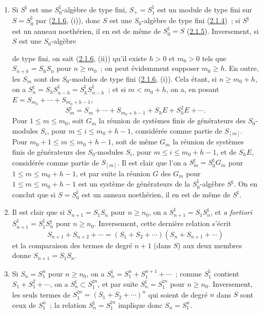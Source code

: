 \begin{enumerate}
\item[\rm(i)] Si $S^\natural$ est une $S_0^\natural$-algèbre de type fini,
$S_+=S_1^\natural$ est un module de type fini sur $S=S_0^\natural$ par
(\hyperref[II.2.1.6-fr]{2.1.6}, (i)), donc $S$ est une $S_0$-algèbre de type
fini (\hyperref[II.2.1.4-fr]{2.1.4})~; si $S^\natural$ est un anneau
noethérien, il en est de même de $S_0^\natural=S$
(\hyperref[II.2.1.5-fr]{2.1.5}). Inversement, si $S$ est une $S_0$-algèbre

de type fini, on sait (\hyperref[II.2.1.6-fr]{2.1.6}, (ii)) qu'il existe
$h>0$ et $m_0>0$ tels que $S_{n+h}=S_hS_n$ pour $n\geq m_0$~; on peut
évidemment supposer $m_0\geq h$. En outre, les $S_m$ sont des $S_0$-modules
de type fini (\hyperref[II.2.1.6-fr]{2.1.6}, (i)). Cela étant, si
$n\geq m_0+h$, on a $S_n^\natural=S_hS_{n-h}^\natural
=S_h^\natural S_{n-h}^\natural$~; et si $m<m_0+h$, on a, en posant
$E=S_{m_0}+\cdots+S_{m_0+h-1}$,
\[
  S_m^\natural=S_m+\cdots+S_{m_0+h-1}+S_hE+S_h^2E+\cdots.
\]
Pour $1\leq m\leq m_0$, soit $G_m$ la réunion de systèmes finis de
générateurs des $S_0$-modules $S_i$, pour $m\leq i\leq m_0+h-1$,
considérée comme partie de $S_{[m]}$. Pour $m_0+1\leq m\leq m_0+h-1$, soit
de même $G_m$ la réunion de systèmes finis de générateurs des $S_0$-modules
$S_i$, pour $m\leq i\leq m_0+h-1$, et de $S_hE$, considérée comme partie de
$S_{[m]}$. Il est clair que l'on a $S_m^\natural=S_0^\natural G_m$ pour
$1\leq m\leq m_0+h-1$, et par suite la réunion $G$ des $G_m$ pour
$1\leq m\leq m_0+h-1$ est un système de générateurs de la
$S_0^\natural$-algèbre $S^\natural$. On en conclut que si $S=S_0^\natural$
est un anneau noethérien, il en est de même de $S^\natural$.

\item[\rm(ii)] Il est clair que si $S_{n+1}=S_1S_n$ pour $n\geq n_0$, on a
$S_{n+1}^\natural=S_1S_n^\natural$, et \emph{a fortiori}
$S_{n+1}^\natural=S_1^\natural S_n^\natural$ pour $n\geq n_0$.
Inversement, cette dernière relation s'écrit
\[
  S_{n+1}+S_{n+2}+\cdots=(S_1+S_2+\cdots)(S_n+S_{n+1}+\cdots)
\]
et la comparaison des termes de degré $n+1$ (dans $S$) aux deux membres donne
$S_{n+1}=S_1S_n$.

\item[\rm(iii)] Si $S_n=S_1^n$ pour $n\geq n_0$, on a
$S_n^\natural=S_1^n+S_1^{n+1}+\cdots$~; comme $S_1^\natural$ contient
$S_1+S_1^2+\cdots$, on a $S_n^\natural\subset S_1^{\natural n}$, et par suite
$S_n^\natural=S_1^{\natural n}$ pour $n\geq n_0$. Inversement, les seuls
termes de $S_1^{\natural n}=(S_1+S_2+\cdots)^n$ qui soient de degré $n$ dans
$S$ sont ceux de $S_1^n$~; la relation $S_n^\natural=S_1^{\natural n}$
implique donc $S_n=S_1^n$.


\end{enumerate}
